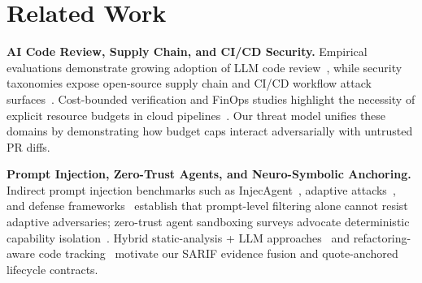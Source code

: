 \section{Related Work}
\label{sec:related}

\textbf{AI Code Review, Supply Chain, and CI/CD Security.}
Empirical evaluations demonstrate growing adoption of LLM code review~\cite{schfer2023empirical,sghaier2025harnessing}, while security taxonomies expose open-source supply chain and CI/CD workflow attack surfaces~\cite{ladisa2023taxonomy,pan2023ambush,rebatchi2024dependabot}. Cost-bounded verification and FinOps studies highlight the necessity of explicit resource budgets in cloud pipelines~\cite{cho2026finops,elfakdi2021evaluating}. Our threat model unifies these domains by demonstrating how budget caps interact adversarially with untrusted PR diffs.

\textbf{Prompt Injection, Zero-Trust Agents, and Neuro-Symbolic Anchoring.}
Indirect prompt injection benchmarks such as InjecAgent~\cite{zhan2024injecagent}, adaptive attacks~\cite{zhan2025adaptive}, and defense frameworks~\cite{alnemari2026genshield,hossain2025multi,wu2024detectrl} establish that prompt-level filtering alone cannot resist adaptive adversaries; zero-trust agent sandboxing surveys advocate deterministic capability isolation~\cite{deng2025agents}. Hybrid static-analysis + LLM approaches~\cite{gnieciak2025large,qin2025advancing} and refactoring-aware code tracking~\cite{tuna2022tracking,hasan2024refactoring} motivate our SARIF evidence fusion and quote-anchored lifecycle contracts.
